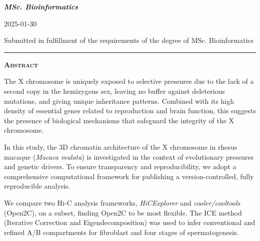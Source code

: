 \documentclass[
  11pt,
  a4paper,
]{scrbook}
\begin{document}
{{\bfseries\Large\textit{MSc. Bioinformatics} \par}
\vspace{3ex}

{\large 2025-01-30 \par}
\vspace{3ex}

\vspace{10ex}
{\small Submitted in fulfillment of the requirements
of the degree of MSc. Bioinformatics \par}
\pagebreak


\vspace*{\fill} %
\noindent
\begin{minipage}{.8\textwidth}
    \centering
    \hspace*{\fill}\rule{0.5\textwidth}{0.4pt}\hspace*{\fill} %
    \par \vspace{2em} %
    {\Large\bfseries\scshape Abstract} %
    \par %
    \vspace{1em} %
    \justifying %
    The X chromosome is uniquely exposed to selective pressures due to
the lack of a second copy in the hemizygous sex, leaving no buffer
against deleterious mutations, and giving unique inheritance patterns.
Combined with its high density of essential genes related to
reproduction and brain function, this suggests the presence of
biological mechanisms that safeguard the integrity of the X chromosome.

In this study, the 3D chromatin architecture of the X chromosome in
rhesus macaque (\emph{Macaca mulata}) is investigated in the context of
evolutionary pressures and genetic drivers. To ensure transparency and
reproducibility, we adopt a comprehensive computational framework for
publishing a version-controlled, fully reproducible analysis.

We compare two Hi-C analysis frameworks, \emph{HiCExplorer} and
\emph{cooler/cooltools} (Open2C), on a subset, finding Open2C to be most
flexible. The ICE method (Iterative Correction and Eigendecomposition)
was used to infer conventional and refined A/B compartments for
fibroblast and four stages of spermatogenesis.


\end{minipage}}
\end{document}
